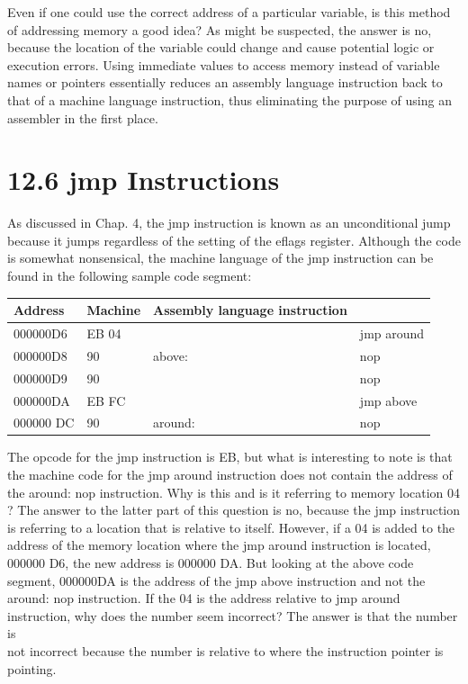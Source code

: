 \documentclass[10pt]{book}
\begin{document}
\begin{center}
\begin{center}
\begin{center}
\begin{center}
\begin{center}
Even if one could use the correct address of a particular variable, is this method of addressing memory a good idea? As might be suspected, the answer is no, because the location of the variable could change and cause potential logic or execution errors. Using immediate values to access memory instead of variable names or pointers essentially reduces an assembly language instruction back to that of a machine language instruction, thus eliminating the purpose of using an assembler in the first place.

\section*{12.6 jmp Instructions}
As discussed in Chap. 4, the jmp instruction is known as an unconditional jump because it jumps regardless of the setting of the eflags register. Although the code is somewhat nonsensical, the machine language of the jmp instruction can be found in the following sample code segment:

\begin{center}
\begin{tabular}{|l|l|l|l|}
\hline
Address & Machine & Assembly language instruction &  \\
\hline
000000D6 & EB 04 &  & jmp around \\
\hline
000000D8 & 90 & above: & nop \\
\hline
000000D9 & 90 &  & nop \\
\hline
000000DA & EB FC &  & jmp above \\
\hline
000000 DC & 90 & around: & nop \\
\hline
\end{tabular}
\end{center}

The opcode for the jmp instruction is EB, but what is interesting to note is that the machine code for the jmp around instruction does not contain the address of the around: nop instruction. Why is this and is it referring to memory location 04 ? The answer to the latter part of this question is no, because the jmp instruction is referring to a location that is relative to itself. However, if a 04 is added to the address of the memory location where the jmp around instruction is located, 000000 D6, the new address is 000000 DA. But looking at the above code segment, 000000DA is the address of the jmp above instruction and not the around: nop instruction. If the 04 is the address relative to jmp around instruction, why does the number seem incorrect? The answer is that the number is\\
not incorrect because the number is relative to where the instruction pointer is pointing.



\end{center}
\end{center}
\end{center}
\end{center}
\end{center}
\end{document}
